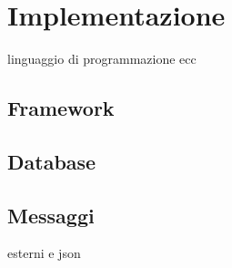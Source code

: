 \chapter{Implementazione}
linguaggio di programmazione ecc
\section{Framework}
\section{Database}
\section{Messaggi}
esterni e json
